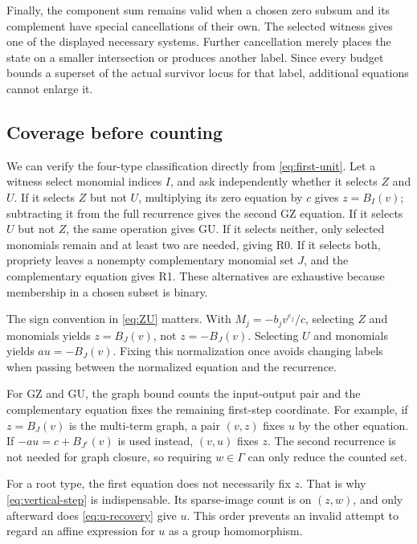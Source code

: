 \documentclass[11pt]{article}
\theoremstyle{definition}
\begin{document}
Finally, the component sum remains valid when a chosen zero subsum and its complement have special cancellations of their own. The selected witness gives one of the displayed necessary systems. Further cancellation merely places the state on a smaller intersection or produces another label. Since every budget bounds a superset of the actual survivor locus for that label, additional equations cannot enlarge it.


\subsection{Coverage before counting}

We can verify the four-type classification directly from \eqref{eq:first-unit}. Let a witness select monomial indices \(I\), and ask independently whether it selects \(Z\) and \(U\). If it selects \(Z\) but not \(U\), multiplying its zero equation by \(c\) gives \(z=B_I(v)\); subtracting it from the full recurrence gives the second GZ equation. If it selects \(U\) but not \(Z\), the same operation gives GU. If it selects neither, only selected monomials remain and at least two are needed, giving R0. If it selects both, propriety leaves a nonempty complementary monomial set \(J\), and the complementary equation gives R1. These alternatives are exhaustive because membership in a chosen subset is binary.

The sign convention in \eqref{eq:ZU} matters. With \(M_j=-b_jv^{e_j}/c\), selecting \(Z\) and monomials yields \(z=B_J(v)\), not \(z=-B_J(v)\). Selecting \(U\) and monomials yields \(au=-B_J(v)\). Fixing this normalization once avoids changing labels when passing between the normalized equation and the recurrence.

For GZ and GU, the graph bound counts the input-output pair and the complementary equation fixes the remaining first-step coordinate. For example, if \(z=B_J(v)\) is the multi-term graph, a pair \((v,z)\) fixes \(u\) by the other equation. If \(-au=c+B_{J^c}(v)\) is used instead, \((v,u)\) fixes \(z\). The second recurrence is not needed for graph closure, so requiring \(w\in\Gamma\) can only reduce the counted set.

For a root type, the first equation does not necessarily fix \(z\). That is why \eqref{eq:vertical-step} is indispensable. Its sparse-image count is on \((z,w)\), and only afterward does \eqref{eq:u-recovery} give \(u\). This order prevents an invalid attempt to regard an affine expression for \(u\) as a group homomorphism.
\end{document}
